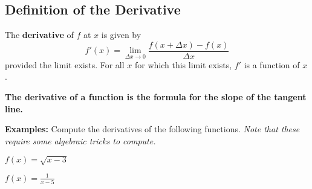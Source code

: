 \documentclass[addpoints, 12pt]{exam}
\begin{document}
\subsection*{Definition of the Derivative}
\begin{tcolorbox}[title= DEFINITION OF THE DERIVATIVE OF A FUNCTION,colframe=black,sharp corners,colback=white,colbacktitle=white,coltitle=black,boxrule=1pt]

    The \textbf{derivative} of $f$ at $x$ is given by
    \[f'(x)=\lim_{\Delta x\to0}\frac{f(x+\Delta x)-f(x)}{\Delta x}\]
    provided the limit exists. For all $x$ for which this limit exists, $f'$ is a function of $x$.
    
\end{tcolorbox}
\vspace{.15cm}
\begin{center}
    \textbf{The derivative of a function is the formula for the slope of the tangent line.}
\end{center}
\noindent\textbf{Examples:} Compute the derivatives of the following functions. \textit{Note that these require some algebraic tricks to compute.}
\begin{questions}
    \question $\displaystyle f(x)=\sqrt{x-3}$
    
    \question $\displaystyle f(x)=\frac{1}{x-5}$
\end{questions}

\newpage
\end{document}
